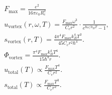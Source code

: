 \documentclass[a4paper,10pt]{article}
\begin{document}
\begin{gather*}
        F_{\text{max}} = \frac{e^2}{16 \pi \varepsilon_0 R_c^2}\\
        u_{\text{vortex}}(r, \omega, T) = \frac{F_\text{max} \omega^3}{C_e r^2} \cdot \frac{1}{e^{\hbar \omega / k_B T} - 1},\\
        s_{\text{vortex}}(r, T) = \frac{4 \pi^4 F_\text{max} k_B^4 T^3}{45 C_e r^2 \hbar^4}.\\
        \Phi_{\text{vortex}} = \frac{\pi^4 F_\text{max} k_B^4 T^4}{15 \hbar^4 r}.\\
        u_{\text{total}}(T) \propto \frac{F_\text{max} T^4}{C_e r^2}.\\
        s_{\text{total}}(T) \propto \frac{F_\text{max} T^3}{C_e r^2}.\\
    \end{gather*}
\end{document}
